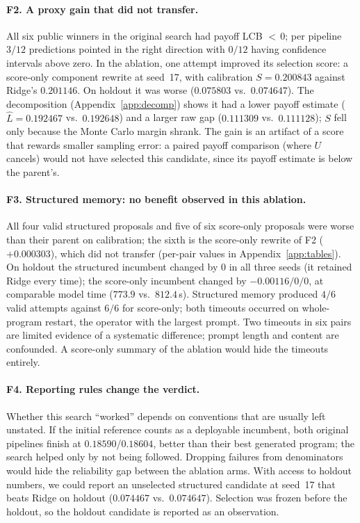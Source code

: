 \documentclass{article}
\begin{document}
\paragraph{F2. A proxy gain that did not transfer.}
All six public winners in the original search had payoff LCB ${<}\,0$; per pipeline $3/12$ predictions pointed in the right direction with $0/12$ having confidence intervals above zero. In the ablation, one attempt improved its selection score: a score-only component rewrite at seed~17, with calibration $S = 0.200843$ against Ridge's $0.201146$. On holdout it was worse ($0.075803$ vs.\ $0.074647$). The decomposition (Appendix~\ref{app:decomp}) shows it had a lower payoff estimate ($\hat L = 0.192467$ vs.\ $0.192648$) and a larger raw gap ($0.111309$ vs.\ $0.111128$); $S$ fell only because the Monte Carlo margin shrank. The gain is an artifact of a score that rewards smaller sampling error: a paired payoff comparison (where $U$ cancels) would not have selected this candidate, since its payoff estimate is below the parent's.

\paragraph{F3. Structured memory: no benefit observed in this ablation.}
All four valid structured proposals and five of six score-only proposals were worse than their parent on calibration; the sixth is the score-only rewrite of F2 ($+0.000303$), which did not transfer (per-pair values in Appendix~\ref{app:tables}). On holdout the structured incumbent changed by $0$ in all three seeds (it retained Ridge every time); the score-only incumbent changed by $-0.00116/0/0$, at comparable model time ($773.9$ vs.\ $812.4$\,s). Structured memory produced $4/6$ valid attempts against $6/6$ for score-only; both timeouts occurred on whole-program restart, the operator with the largest prompt. Two timeouts in six pairs are limited evidence of a systematic difference; prompt length and content are confounded. A score-only summary of the ablation would hide the timeouts entirely.

\paragraph{F4. Reporting rules change the verdict.}
Whether this search ``worked'' depends on conventions that are usually left unstated. If the initial reference counts as a deployable incumbent, both original pipelines finish at $0.18590$/$0.18604$, better than their best generated program; the search helped only by not being followed. Dropping failures from denominators would hide the reliability gap between the ablation arms. With access to holdout numbers, we could report an unselected structured candidate at seed~17 that beats Ridge on holdout ($0.074467$ vs.\ $0.074647$). Selection was frozen before the holdout, so the holdout candidate is reported as an observation.
\end{document}
